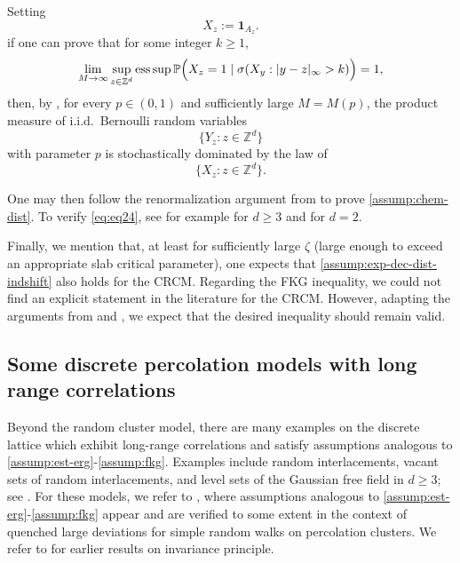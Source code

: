 \documentclass[11pt]{article}
\newcommand{\Z}{\mathbb Z}
\renewcommand{\P}{\mathbb P}
\theoremstyle{rem}
\begin{document}
Setting 
\[
X_z:=\mathbf 1_{A_z}.
\]
if one can prove that for some integer $k\ge1$,
\begin{equation}\label{eq:eq24}
\lim_{M\to\infty}
\sup_{z\in\Z^d}
\mathrm{ess\,sup}\,
\P\Bigl(
X_z=1
\mid
\sigma(X_y:|y-z|_\infty>k)
\Bigr)
=
1,
\end{equation}
then, by \cite[Theorem 1.3]{LSS97}, for every $p\in(0,1)$ and sufficiently large $M=M(p)$, the product measure of i.i.d.\ Bernoulli random variables
\[
\{Y_z:z\in\Z^d\}
\]
with parameter $p$ is stochastically dominated by the law of
\[
\{X_z:z\in\Z^d\}.
\]

One may then follow the renormalization argument from \cite[pp.~160--161]{CGY11} to prove \ref{assump:chem-dist}. To verify \eqref{eq:eq24}, see for example \cite[Theorem 3.1]{P96} for $d\ge3$ and \cite[Theorem 9]{CM04} for $d=2$.

Finally, we mention that, at least for sufficiently large $\zeta$ (large enough to exceed an appropriate slab critical parameter), one expects that \ref{assump:exp-dec-dist-indshift} also holds for the CRCM. Regarding the FKG inequality, we could not find an explicit statement in the literature for the CRCM. However, adapting the arguments from \cite[Theorem 4.17]{G06} and \cite[Theorem 2.2]{MR96}, we expect that the desired inequality should remain valid.

\subsection{Some discrete percolation models with long range correlations}
Beyond the random cluster model, there are many examples on the discrete lattice which exhibit long-range correlations and satisfy assumptions analogous to \ref{assump:est-erg}-\ref{assump:fkg}. Examples include random interlacements, vacant sets of random interlacements, and level sets of the Gaussian free field in $d\geq3$; see \cite{Sz10,T09,T09aap,CP12,DRS14,PRS15}. For these models, we refer to \cite{BMO16}, where assumptions analogous to \ref{assump:est-erg}-\ref{assump:fkg} appear and are verified to some extent in the context of quenched large deviations for simple random walks on percolation clusters. We refer to \cite{KV86,SS04,BB07,MP07,PRS15} for earlier results on invariance principle.   
    
    
    
    




 
\end{document}
